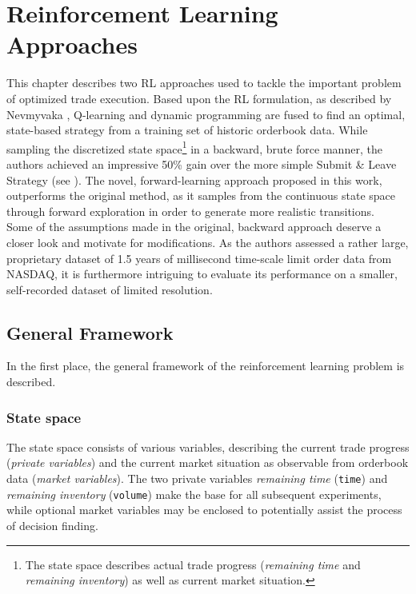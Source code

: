 \chapter{Reinforcement Learning Approaches}
\label{chap:reinforcementlearning}
This chapter describes two \ac{RL} approaches used to tackle the important problem of optimized trade execution. Based upon the \ac{RL} formulation, as described by Nevmyvaka \etal \cite{Nevmyvaka:2006}, Q-learning and dynamic programming are fused to find an optimal, state-based strategy from a training set of historic orderbook data. While sampling the discretized state space\footnote{The state space describes actual trade progress (\ie \emph{remaining time} and \emph{remaining inventory}) as well as current market situation.} in a backward, brute force manner, the authors achieved an impressive 50\% gain over the more simple Submit \& Leave Strategy (see ). The novel, forward-learning approach proposed in this work, outperforms the original method, as it samples from the continuous state space through forward exploration in order to generate more realistic transitions.\\

Some of the assumptions made in the original, backward approach deserve a closer look and motivate for modifications. As the authors assessed a rather large, proprietary dataset of 1.5 years of millisecond time-scale limit order data from \acs{NASDAQ}, it is furthermore intriguing to evaluate its performance on a smaller, self-recorded dataset of limited resolution.






\section{General Framework}
\label{chap:reinforcementlearning:original}
In the first place, the general framework of the reinforcement learning problem is described.


\subsection{State space}
\label{chap:statespace}
The state space consists of various variables, describing the current trade progress (\emph{private variables}) and the current market situation as observable from orderbook data (\emph{market variables}). The two private variables \emph{remaining time} (\lstinline!time!) and \emph{remaining inventory} (\lstinline!volume!) make the base for all subsequent experiments, while optional market variables may be enclosed to potentially assist the process of decision finding.\\


